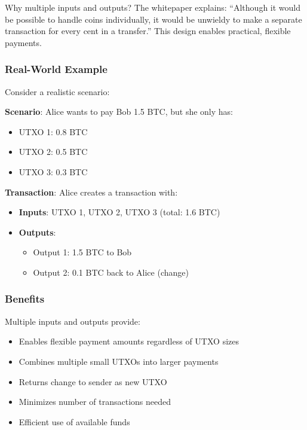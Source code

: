 Why multiple inputs and outputs? The whitepaper explains: ``Although it would be possible to handle coins individually, it would be unwieldy to make a separate transaction for every cent in a transfer.'' This design enables practical, flexible payments.

\subsubsection{Real-World Example}

Consider a realistic scenario:

\textbf{Scenario}: Alice wants to pay Bob 1.5 BTC, but she only has:
\begin{itemize}
  \item UTXO 1: 0.8 BTC
  \item UTXO 2: 0.5 BTC
  \item UTXO 3: 0.3 BTC
\end{itemize}

\textbf{Transaction}: Alice creates a transaction with:
\begin{itemize}
  \item \textbf{Inputs}: UTXO 1, UTXO 2, UTXO 3 (total: 1.6 BTC)
  \item \textbf{Outputs}:
    \begin{itemize}
      \item Output 1: 1.5 BTC to Bob
      \item Output 2: 0.1 BTC back to Alice (change)
    \end{itemize}
\end{itemize}

\needspace{2.5in}
\subsubsection{Benefits}

Multiple inputs and outputs provide:

\begin{itemize}
  \item Enables flexible payment amounts regardless of UTXO sizes
  \item Combines multiple small UTXOs into larger payments
  \item Returns change to sender as new UTXO
  \item Minimizes number of transactions needed
  \item Efficient use of available funds
\end{itemize}

